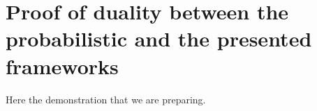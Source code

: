 
%

\appendices

\section{Proof of duality between the probabilistic and the presented frameworks}
Here the demonstration that we are preparing.


